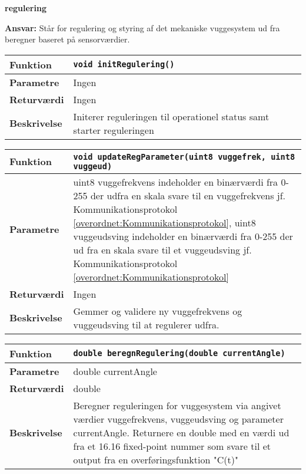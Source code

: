 {\centering
\textbf{regulering}\par
}
\textbf{Ansvar:} Står for regulering og styring af det mekaniske vuggesystem ud fra beregner baseret på sensorværdier. \

\begin{center}
    \begin{tabular}{ | l | p{} |}
    \hline
    \textbf{Funktion}	& \verb+void initRegulering() +								\\ \hline
    \textbf{Parametre} 	& Ingen														\\ \hline
    \textbf{Returværdi}	& Ingen														\\ \hline
    \textbf{Beskrivelse}	& Initerer reguleringen til operationel status samt starter reguleringen	\\ \hline
    \end{tabular}
\end{center}

\begin{center}
    \begin{tabular}{ | l | p{} |}
    \hline
    \textbf{Funktion}	& \verb+void updateRegParameter(uint8 vuggefrek, uint8 vuggeud) +								\\ \hline
    \textbf{Parametre} 	& uint8 vuggefrekvens indeholder en binærværdi fra 0-255 der udfra en skala svare til en vuggefrekvens jf. Kommunikationsprotokol \ref{overordnet:Kommunikationsprotokol}, uint8 vuggeudsving indeholder en binærværdi fra 0-255 der ud fra en skala svare til et vuggeudsving jf. Kommunikationsprotokol \ref{overordnet:Kommunikationsprotokol}						\\ \hline
    \textbf{Returværdi}	& Ingen														\\ \hline
    \textbf{Beskrivelse}	& Gemmer og validere ny vuggefrekvens og vuggeudsving til at regulerer udfra. 	\\ \hline
    \end{tabular}
\end{center}


\begin{center}
    \begin{tabular}{ | l | p{} |}
    \hline
    \textbf{Funktion}	& \verb+double beregnRegulering(double currentAngle) +								\\ \hline
    \textbf{Parametre} 	& double currentAngle					\\ \hline
    \textbf{Returværdi}	& double													\\ \hline
    \textbf{Beskrivelse}	& Beregner reguleringen for vuggesystem via angivet værdier vuggefrekvens, vuggeudsving og parameter currentAngle. Returnere en double med en værdi ud fra et 16.16 fixed-point nummer som svare til et output fra en overføringsfunktion "C(t)"	\\ \hline
    \end{tabular}
\end{center}

